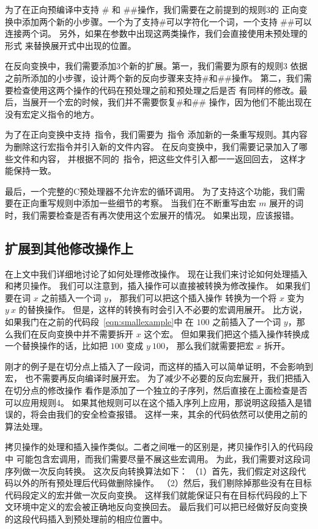 为了在正向预编译中支持 \# 和 \#\#操作，我们需要在之前提到的规则3的
正向变换中添加两个新的小步骤。一个为了支持\#可以字符化一个词，一个支持
\#\#可以连接两个词。
另外，如果在参数中出现这两类操作，我们会直接使用未预处理的形式
来替换展开式中出现的位置。

在反向变换中，我们需要添加3个新的扩展。第一，我们需要为原有的规则3
依据之前所添加的小步骤，设计两个新的反向步骤来支持\#和\#\#操作。
第二，我们需要检查使用这两个操作的代码在预处理之前和预处理之后是否
有同样的修改。最后，当展开一个宏的时候，我们并不需要恢复\#和\#\#
操作，因为他们不能出现在没有宏定义指令的地方。

为了在正向变换中支持~指令，我们需要为~指令
添加新的一条重写规则。其内容为删除这行宏指令并引入新的文件内容。
在反向变换中，我们需要记录加入了哪些文件和内容，
并根据不同的~指令，把这些文件引入都一一返回回去，
这样才能保持一致。

最后，一个完整的C预处理器不允许宏的循环调用。
为了支持这个功能，我们需要在正向重写规则中添加一些细节的考察。
当我们在不断重写由宏 $m$ 展开的词时，我们需要检查是否有再次使用这个宏展开的情况。
如果出现，应该报错。

\subsection{扩展到其他修改操作上}\label{sec:extend-other-changes}
在上文中我们详细地讨论了如何处理修改操作。
现在让我们来讨论如何处理插入和拷贝操作。
我们可以注意到，插入操作可以直接被转换为修改操作。
如果我们要在词 $x$ 之前插入一个词 $y$， 那我们可以把这个插入操作
转换为一个将 $x$ 变为  $y\ x$ 的替换操作。
但是，这样的转换有时会引入不必要的宏调用展开。
比方说，如果我门在之前的代码段~\ref{eqn:smallexample}中
在 $100$ 之前插入了一个词 $y$，那么我们在反向变换中并不需要拆开 $x$ 这个宏。
但如果我们把这个插入操作转换成一个替换操作的话，比如把 $100$ 变成 $y\ 100$，
那么我们就需要把宏 $x$ 拆开。

刚才的例子是在切分点上插入了一段词，而这样的插入可以简单证明，不会影响到宏，
也不需要再反向编译时展开宏。
为了减少不必要的反向宏展开，我们把插入在切分点的修改操作
看作是添加了一个独立的子序列，然后直接在上面检查是否可以应用规则4。
如果其他规则可以在这个插入序列上应用，那说明这段插入是错误的，将会由我们的安全检查报错。
这样一来，其余的代码依然可以使用之前的算法处理。

拷贝操作的处理和插入操作类似。二者之间唯一的区别是，拷贝操作引入的代码段中
可能包含宏调用，而我们需要尽量不展这些宏调用。
为此，我们需要对这段词序列做一次反向转换。
这次反向转换算法如下：
（1）首先，我们假定对这段代码以外的所有预处理后代码做删除操作。
（2）然后，我们剔除掉那些没有在目标代码段定义的宏并做一次反向变换。
这样我们就能保证只有在目标代码段的上下文环境中定义的宏会被正确地反向变换回去。
最后我们可以把已经做好反向变换的这段代码插入到预处理前的相应位置中。


